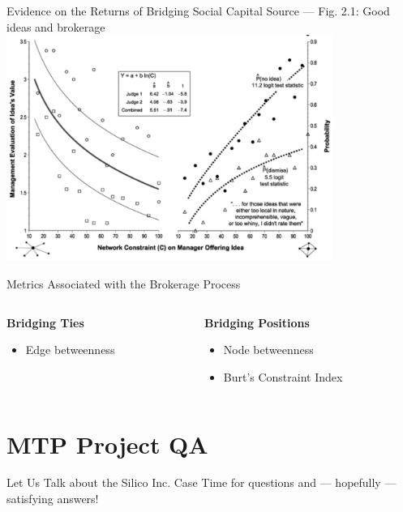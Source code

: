 \documentclass[notes, aspectratio=1610]{beamer}
\begin{document}
\begin{frame}{Evidence on the Returns of Bridging Social Capital}
	{Source \cite{burt2007} --- Fig. 2.1: Good ideas and brokerage}
	\centering
	\includegraphics[width=0.8\textwidth]{images/good_ideas.png}
\end{frame}


\begin{frame}{Metrics Associated with the Brokerage Process}
	\begin{columns}[t]
		\begin{column}{0.5\textwidth}
			\textbf{Bridging Ties}
			\begin{itemize}
				\item Edge betweenness
			\end{itemize}
		\end{column}
		\begin{column}{0.5\textwidth}
			\textbf{Bridging Positions}
			\begin{itemize}
				\item Node betweenness
				\item Burt's Constraint Index
			\end{itemize}
		\end{column}
	\end{columns}
\end{frame}

\section{MTP Project QA}

\begin{frame}{Let Us Talk about the Silico Inc. Case}{}
	\Large \centering Time for questions and --- hopefully --- satisfying answers! 
\end{frame}
\end{document}
